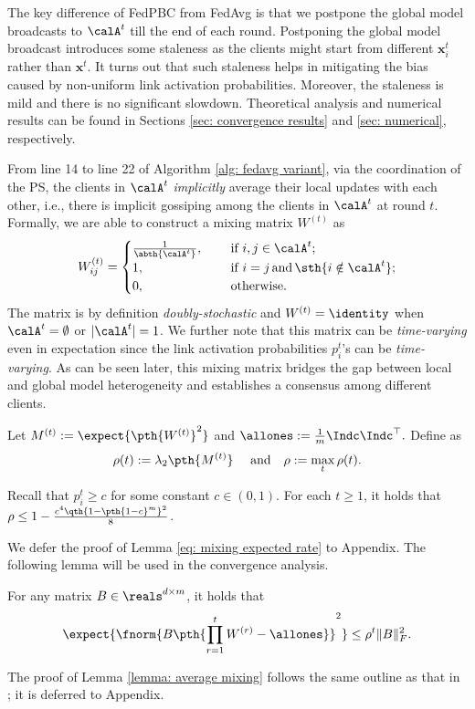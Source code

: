 \documentclass[letterpaper, 10 pt, conference]{ieeeconf}  %
\newcommand{\x}{{\bm x}}
\begin{document}
The key difference of {FedPBC} from {FedAvg} is that we postpone the global model broadcasts to $\calA^t$ till the end of each round. Postponing the global model broadcast introduces some staleness as the clients might start from different $\x_i^t$ rather than $\x^t$. It turns out that such staleness helps in mitigating the bias caused by non-uniform link activation probabilities.
Moreover, the staleness is mild and there is no significant slowdown. Theoretical analysis and numerical results can be found in Sections \ref{sec: convergence results} and \ref{sec: numerical}, respectively. 


\baselineskip 
{}
From line 14 to line 22 of Algorithm \ref{alg: fedavg variant}, via the coordination of the PS, the clients in $\calA^t$ {\em implicitly} average their local updates with each other, i.e., there is implicit gossiping among the clients in $\calA^t$ at round $t$. 
Formally, we are able to construct a mixing matrix $W^{(t)}$ as
\begin{align*}
W_{ij}^{(t)} =
\begin{cases} 
\frac{1}{\abth{\calA^t}}, &~~~~ \text{if }i, j\in \calA^t; \\    
1, &~~~~ \text{if } i=j\,\text{and} \,\sth{i\notin \calA^t};\\ %
0, &~~~~ \text{otherwise}. 
\end{cases}
\end{align*}
The matrix is by definition {\it doubly-stochastic} and $W^{(t)} = \identity$ when $\calA^t =\emptyset$ or $|\calA^t| =1$.   
We further note that this matrix can be {\it time-varying} even in expectation since the link activation probabilities $p_i^t$'s can be {\it time-varying}. 
As can be seen later, %
this mixing matrix bridges the gap between local and global model heterogeneity and establishes a consensus among different clients.



Let $M^{(t)}: = \expect{\pth{W^{(t)}}^2}$ and $\allones : = \frac{1}{m} \Indc \Indc^\top.$ Define %
as 
 \begin{align}
\label{eq: mixing expected rate}
\rho(t):=\lambda_2\pth{M^{(t)}} ~~~~ \text{and} ~~~ \rho := \max_t \rho(t). 
\end{align}
\begin{lemma}[Ergodicity]
\label{lemma: ergodicity}
Recall that $p_i^t\ge c$ for some constant $c\in (0,1)$. For each $t\ge 1$, it holds that 
$\rho \le 1 - \frac{c^4\qth{1-\pth{1-c}^m}^2}{8}$. 
\end{lemma}
We defer the proof of Lemma \ref{eq: mixing expected rate} to Appendix. 
The following lemma will be used in the convergence analysis. 
\begin{lemma}
\label{lemma: average mixing}
For any matrix $B\in \reals^{d\times m}$, it holds that 
\[
\expect{\fnorm{B\pth{\prod_{r=1}^t W^{(r)} - \allones}}^2} \le \rho^t\|B\|^2_F.  
\] 
\end{lemma}
The proof of Lemma \ref{lemma: average mixing} follows the same outline as that in \cite[Lemma]{wang2022matcha}; it is deferred to Appendix.
\end{document}

